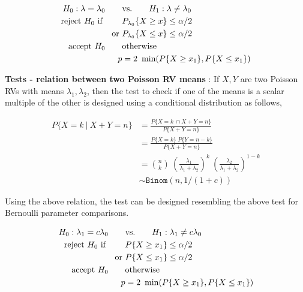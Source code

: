 \begin{align}
	H_0 : \lambda  = \lambda_0 \qquad &\text{vs.} \qquad H_1 : \lambda  \neq \lambda_0 \nonumber \\
	\text{reject $ H_0 $ if } \qquad & P_{\lambda_0}\{X \geq x\} \leq \alpha/2  \nonumber \\
	\text{or }& P_{\lambda_0}\{X \leq x\} \leq \alpha/2 \nonumber \\
	\text{accept $ H_0 $} \qquad & \text{otherwise} \\
	p &= 2\ \min(P\{X \geq x_1\}, P\{X \leq x_1\})
\end{align}

\textbf{Tests - relation between two Poisson RV means} : If $ X, Y $ are two Poisson RVs with means $ \lambda_1, \lambda_2 $, then the test to check if one of the means is a scalar multiple of the other is designed using a conditional distribution as follows,

\begin{align}
	P \{X = k\ |\ X+Y = n\} &= \frac{P\{X = k\ \cap X+Y = n\}}{P \{X+Y = n\}} \nonumber \\
	&= \frac{P\{X = k\}\ P\{Y = n-k\}}{P \{X+Y = n\}} \nonumber \\
	&= \binom{n}{k}\ \left(\frac{\lambda_1}{\lambda_1+ \lambda_2}\right)^k\ \left(\frac{\lambda_2}{\lambda_1+ \lambda_2}\right)^{1-k} \nonumber \\
	&\sim \texttt{Binom}(n, 1/(1+c))
\end{align}

Using the above relation, the test can be designed resembling the above test for Bernoulli parameter comparisons.

\begin{align}
	H_0 : \lambda_1  = c\lambda_0 \qquad &\text{vs.} \qquad H_1 : \lambda_1  \neq c\lambda_0 \nonumber \\
	\text{reject $ H_0 $ if } \qquad & P\{X \geq x_1\} \leq \alpha/2  \nonumber \\
	\text{or }& P\{X \leq x_1\} \leq \alpha/2 \nonumber \\
	\text{accept $ H_0 $} \qquad & \text{otherwise} \\
	p &= 2\ \min(P\{X \geq x_1\}, P\{X \leq x_1\})
\end{align}
\newpage

